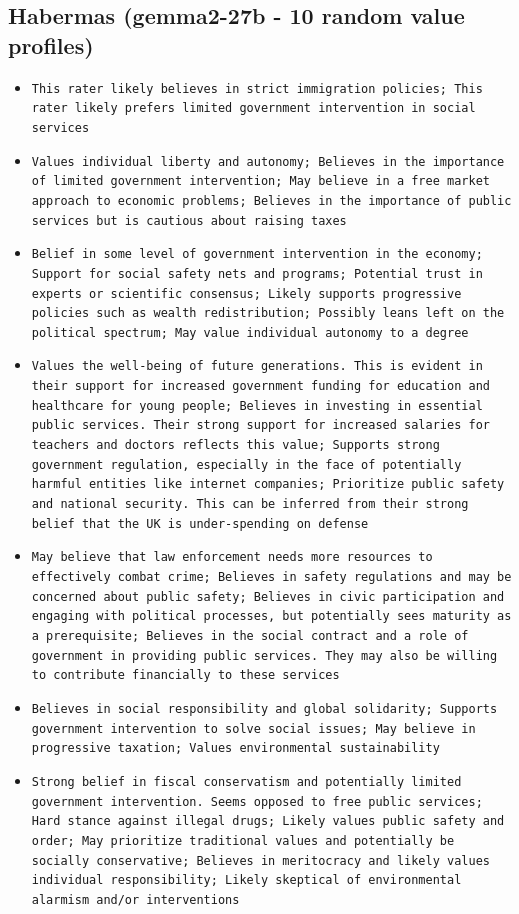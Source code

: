 \documentclass[11pt]{article}
\begin{document}
\subsection{Habermas (gemma2-27b - 10 random value profiles)}
\begin{itemize}
\item \texttt{This rater likely believes in strict immigration policies; This rater likely prefers limited government intervention in social services}
\item \texttt{Values individual liberty and autonomy; Believes in the importance of limited government intervention; May believe in a free market approach to economic problems; Believes in the importance of public services but is cautious about raising taxes}
\item \texttt{Belief in some level of government intervention in the economy; Support for social safety nets and programs; Potential trust in experts or scientific consensus; Likely supports progressive policies such as wealth redistribution; Possibly leans left on the political spectrum; May value individual autonomy to a degree}
\item \texttt{Values the well-being of future generations. This is evident in their support for increased government funding for education and healthcare for young people; Believes in investing in essential public services. Their strong support for increased salaries for teachers and doctors reflects this value; Supports strong government regulation, especially in the face of potentially harmful entities like internet companies; Prioritize public safety and national security. This can be inferred from their strong belief that the UK is under-spending on defense}
\item \texttt{May believe that law enforcement needs more resources to effectively combat crime; Believes in safety regulations and may be concerned about public safety; Believes in civic participation and engaging with political processes, but potentially sees maturity as a prerequisite; Believes in the social contract and a role of government in providing public services. They may also be willing to contribute financially to these services}
\item \texttt{Believes in social responsibility and global solidarity; Supports government intervention to solve social issues; May believe in progressive taxation; Values environmental sustainability}
\item \texttt{Strong belief in fiscal conservatism and potentially limited government intervention. Seems opposed to free public services; Hard stance against illegal drugs; Likely values public safety and order; May prioritize traditional values and potentially be socially conservative; Believes in meritocracy and likely values individual responsibility; Likely skeptical of environmental alarmism and/or interventions}

\end{itemize}
\end{document}

